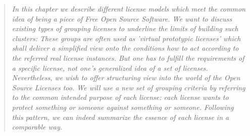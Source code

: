 %
%
%
%
%


\footnotesize \begin{quote}\itshape In this chapter we describe different
license models which meet the common idea of being a piece of Free Open Source
Software. We want to discuss existing types of grouping licenses to underline
the limits of building such clusters: These groups are often used as 'virtual
prototypic licenses' which shall deliver a simplified view onto the conditions
how to act according to the referred real license instances. But one has to
fulfill the requirements of a specific license, not one's generalized idea of a
set of licenses. Nevertheless, we wish to offer structuring view into the world
of the Open Source Licenses too. We will use a new set of grouping criteria by
referring to the common intended purpose of each license: each license wants to
protect something or someone against something or someone. Following this
pattern, we can indeed summarize the essence of each license in a comparable
way.
\end{quote}
\normalsize{}

